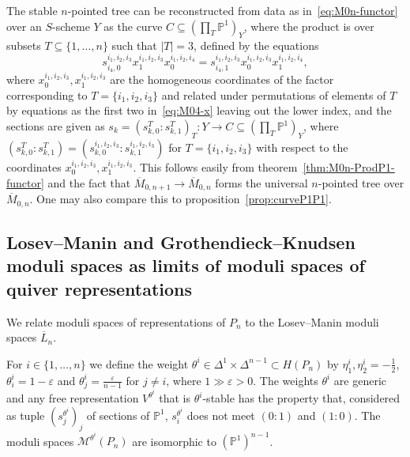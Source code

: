 \documentclass[ALCO,ThmDefs,Unicode,epreuves]{cedram}
\def\P{\mathds P}
\begin{document}

\begin{rema}\label{rem:M0n-functor} 
The stable $n$-pointed tree can be reconstructed from data as in~\eqref{eq:M0n-functor}
over an $S$-scheme $Y$ as the curve $C\subseteq(\prod_T\P^1)_Y$, where the product is
over subsets $T\subseteq\{1,\ldots,n\}$ such that $|T|=3$, defined by the equations
\[
s^{i_1,i_2,i_3}_{i_4,0}x^{i_1,i_2,i_3}_1x^{i_1,i_2,i_4}_0
=s^{i_1,i_2,i_3}_{i_4,1}x^{i_1,i_2,i_3}_0x^{i_1,i_2,i_4}_1,
\] 
where $x^{i_1,i_2,i_3}_0,x^{i_1,i_2,i_3}_1$ are the homogeneous coordinates 
of the factor corresponding to $T=\{i_1,i_2,i_3\}$ and related under 
permutations of elements of $T$ by equations as the first two in~\eqref{eq:M04-x} 
leaving out the lower index, and the sections are given as
$s_k=(s^T_{k,0}:s^T_{k,1})_T\colon Y\to C\subseteq(\prod_T\P^1)_Y$,
where $(s^T_{k,0}:s^T_{k,1})=(s^{i_1,i_2,i_3}_{k,0}:s^{i_1,i_2,i_3}_{k,1})$ for 
$T=\{i_1,i_2,i_3\}$ with respect to the coordinates $x^{i_1,i_2,i_3}_0,x^{i_1,i_2,i_3}_1$.
This follows easily from theorem~\ref{thm:M0n-ProdP1-functor} and the fact that
$\overline{M}_{0,n+1}\to\overline{M}_{0,n}$ forms the universal $n$-pointed tree over 
$\overline{M}_{0,n}$. One may also compare this to proposition~\ref{prop:curveP1P1}.
\end{rema}


\subsection{Losev--Manin and Grothendieck--Knudsen moduli spaces as limits of moduli spaces of quiver representations}


We relate moduli spaces of representations of $P_n$ 
to the Losev--Manin moduli spaces $\overline{L}_n$.


For $i\in\{1,\ldots,n\}$ we define the weight 
$\theta^i\in\Delta^1\times\Delta^{n-1}\subset H(P_n)$ by 
$\eta^i_1,\eta^i_2=-\frac{1}{2}$, $\theta^i_i=1-\varepsilon$ and 
$\theta^i_j=\frac{\varepsilon}{n-1}$ for $j\neq i$, where $1\gg\varepsilon>0$.
The weights $\theta^i$ are generic and any free representation $V^{\theta^i}$ that is 
$\theta^i$-stable has the property that, considered as tuple $(s^{\theta^i}_j)_j$
of sections of $\P^1$, $s^{\theta^i}_i$ does not meet $(0:1)$ and $(1:0)$. 
The moduli spaces $\mathcal M^{\theta^i}(P_n)$ are isomorphic to $(\P^1)^{n-1}$.
\end{document}
